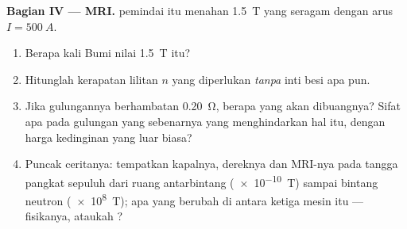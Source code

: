 \begin{problem}
\medskip
\noindent\textbf{Bagian IV --- MRI.}
 pemindai itu menahan \qty{1.5}{T} yang seragam dengan arus
$I = \qty{500}{A}$.
\begin{enumerate}[resume]
  \item Berapa kali  Bumi nilai \qty{1.5}{T} itu?
  \item Hitunglah kerapatan lilitan $n$ yang diperlukan \emph{tanpa}
        inti besi apa pun.
  \item Jika gulungannya berhambatan \qty{0.20}{\ohm},  berapa yang
        akan dibuangnya? Sifat apa pada gulungan yang sebenarnya yang
        menghindarkan hal itu, dengan harga kedinginan yang luar biasa?
  \item Puncak ceritanya: tempatkan  kapalnya, dereknya dan
        MRI-nya pada tangga pangkat sepuluh dari ruang antarbintang
        (\qty{e-10}{T}) sampai bintang neutron (\qty{e8}{T}); apa yang
        berubah di antara ketiga mesin itu --- fisikanya, ataukah
        ?
\end{enumerate}
\end{problem}

